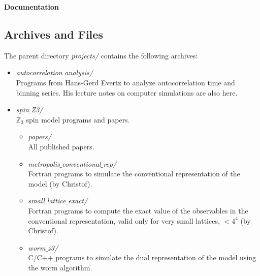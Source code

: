 \documentclass[a4paper,10pt]{report}
\begin{document}
\begin{center}
{\bf \Large Documentation} 
\end{center}
\vspace*{10mm}

\subsection*{Archives and Files}

The parent directory {\it projects/} contains the following archives:

\begin{itemize}[leftmargin=*]
 \item {\it autocorrelation$\_$analysis/}
 \\Programs from Hans-Gerd Evertz to analyze autocorrelation time and binning series.  
 His lecture notes on computer simulations are also here.
 
 \item {\it spin$\_$Z3/}
 \\$\mathds{Z}_3$ spin model programs and papers.
 \begin{itemize}[leftmargin=*]
  \item {\it papers/}
  \\All published papers.
  \item {\it metropolis$\_$conventional$\_$rep/}
  \\Fortran programs to simulate the conventional
  representation of the model (by Christof).
  \item {\it small$\_$lattice$\_$exact/}
  \\Fortran programs to compute the exact value of the observables in the conventional
  representation, valid only for very small lattices, $< 4^4$ (by Christof).
  \item {\it worm$\_$z3/}
  \\C/C++ programs to simulate the dual representation of the model using
  the worm algorithm.
 \end{itemize}
  

\end{itemize}
\end{document}
